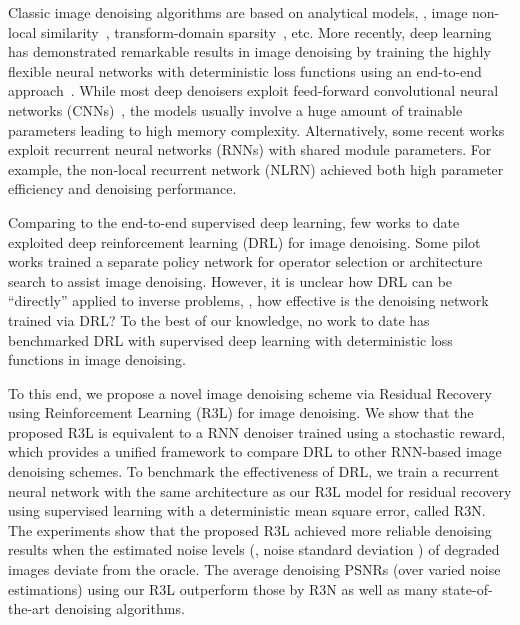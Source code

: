 \documentclass{article}
\begin{document}
Classic image denoising algorithms are based on analytical models, \eg, image non-local similarity~\cite{10.1007/978-3-642-04146-4_9,dabov2007image,6909762}, transform-domain sparsity~\cite{liu2017image,wen2015structured}, etc.
More recently, deep learning has demonstrated remarkable results in image denoising by training the highly flexible neural networks with deterministic loss functions using an end-to-end approach~\cite{guo2019toward, Chen_2017,Zhang_2017,liu2018non}.
While most deep denoisers exploit feed-forward convolutional neural networks (CNNs)~\cite{Zhang_2017}, the models usually involve a huge amount of trainable parameters leading to high memory complexity.
Alternatively, some recent works exploit recurrent neural networks (RNNs) with shared module parameters. For example, the non-local recurrent network (NLRN) \cite{liu2018non} achieved both high parameter efficiency and denoising performance.




Comparing to the end-to-end supervised deep learning, few works to date exploited deep reinforcement learning (DRL) for image denoising.
Some pilot works trained a separate policy network for operator selection \cite{yu2018crafting,furuta2019fully} or architecture search \cite{yu2019pathrestore, vassilo2020multi} to assist image denoising.
However, it is unclear how DRL can be ``directly'' applied to inverse problems, \eg, how effective is the denoising network trained via DRL?
To the best of our knowledge, no work to date has benchmarked DRL with supervised deep learning with deterministic loss functions in image denoising.

To this end, we propose a novel image denoising scheme via Residual Recovery using Reinforcement Learning (R3L) for image denoising.
We show that the proposed R3L is equivalent to a RNN denoiser trained using a stochastic reward, which provides a unified framework to compare DRL to other RNN-based image denoising schemes.
To benchmark the effectiveness of DRL, we train a recurrent neural network with the same architecture as our R3L model for residual recovery using supervised learning with a deterministic mean square error, called R3N.
The experiments show that the proposed R3L achieved more reliable denoising results when the estimated noise levels (\ie, noise standard deviation ) of degraded images deviate from the oracle. 
The average denoising PSNRs (over varied noise estimations) using our R3L outperform those by R3N as well as many state-of-the-art denoising algorithms. 
\end{document}
